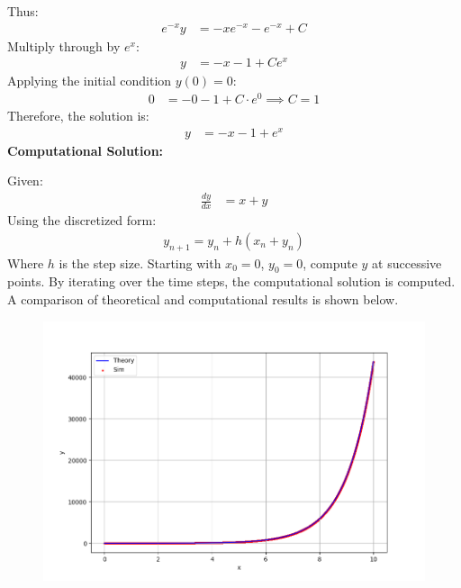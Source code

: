 \documentclass[journal]{IEEEtran}
\begin{document}
Thus:
\begin{align}
    e^{-x}y &= -xe^{-x} - e^{-x} + C
\end{align}
Multiply through by $e^x$:
\begin{align}
    y &= -x - 1 + Ce^x
\end{align}
\newline
Applying the initial condition $y(0) = 0$:
\begin{align}
    0 &= -0 - 1 + C \cdot e^0 \implies C = 1
\end{align}
Therefore, the solution is:
\begin{align}
    y &= -x - 1 + e^x
\end{align}
\newline
\textbf{Computational Solution:}

Given:
\begin{align}
    \frac{dy}{dx} &= x + y
\end{align}
Using the discretized form:
\begin{align}
    y_{n+1} = y_n + h(x_n + y_n)
\end{align}
Where $h$ is the step size. Starting with $x_0 = 0$, $y_0 = 0$, compute $y$ at successive points. 
\newline
By iterating over the time steps, the computational solution is computed. A comparison of theoretical and computational results is shown below.
\newline
\begin{figure}[h!]
   \centering
   \includegraphics[width=\columnwidth]{fig/fig.png}
   \label{comparison}
\end{figure}
\newline
\end{document}
